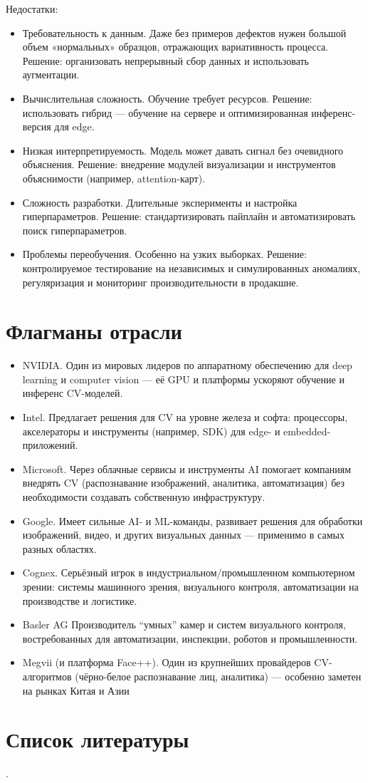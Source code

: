 \documentclass[14 pt,a4paper]{article}
\begin{document}
Недостатки:
\begin{itemize}
	\item Требовательность к данным. Даже без примеров дефектов нужен большой объем «нормальных» образцов, отражающих вариативность процесса. Решение: организовать непрерывный сбор данных и использовать аугментации.

	\item Вычислительная сложность. Обучение требует ресурсов. Решение: использовать гибрид — обучение на сервере и оптимизированная инференс-версия для edge.

	\item Низкая интерпретируемость. Модель может давать сигнал без очевидного объяснения. Решение: внедрение модулей визуализации и инструментов объяснимости (например, attention-карт).

	\item Сложность разработки. Длительные эксперименты и настройка гиперпараметров. Решение: стандартизировать пайплайн и автоматизировать поиск гиперпараметров.
	
	\item Проблемы переобучения. Особенно на узких выборках. Решение: контролируемое тестирование на независимых и симулированных аномалиях, регуляризация и мониторинг производительности в продакшне.
\end{itemize}

\section{Флагманы отрасли}
\begin{itemize}
	\item NVIDIA. Один из мировых лидеров по аппаратному обеспечению для deep learning и computer vision — её GPU и платформы ускоряют обучение и инференс CV-моделей. 
	\item Intel. Предлагает решения для CV на уровне железа и софта: процессоры, акселераторы и инструменты (например, SDK) для edge- и embedded-приложений. 
	\item Microsoft. Через облачные сервисы и инструменты AI помогает компаниям внедрять CV (распознавание изображений, аналитика, автоматизация) без необходимости создавать собственную инфраструктуру. 
	\item Google. Имеет сильные AI- и ML-команды, развивает решения для обработки изображений, видео, и других визуальных данных — применимо в самых разных областях. 
	\item Cognex. Серьёзный игрок в индустриальном/промышленном компьютерном зрении: системы машинного зрения, визуального контроля, автоматизации на производстве и логистике. 
	\item Basler AG	Производитель “умных” камер и систем визуального контроля, востребованных для автоматизации, инспекции, роботов и промышленности. 
	\item Megvii (и платформа Face++). Один из крупнейших провайдеров CV-алгоритмов (чёрно-белое распознавание лиц, аналитика) — особенно заметен на рынках Китая и Азии
\end{itemize}

\section{Список литературы}.
\end{document}

